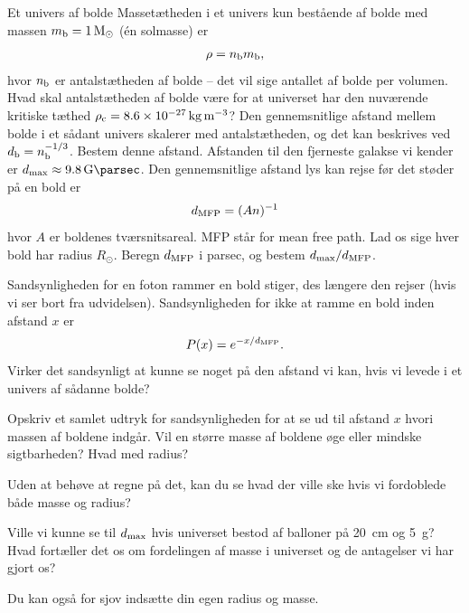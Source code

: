 \documentclass[crop=false, class=memoir]{standalone}
\begin{document}
\begin{opgave}[3]{Et univers af bolde}
Massetætheden i et univers kun bestående af bolde med massen $m_\textup{b} = \SI{1}{M_\odot}$ (én solmasse) er
%
\begin{align} \label{eq:antalsdensitet}
    \rho = n_\textup{b}m_\textup{b},
\end{align}
%
hvor $n_\textup{b}$ er antalstætheden af bolde -- det vil sige antallet af bolde per volumen.
\opg Hvad skal antalstætheden af bolde være for at universet har den nuværende kritiske tæthed $\rho_\textup{c} = \SI{8.6e-27}{\kilogram\per\cubic\metre}$?
\opg Den gennemsnitlige afstand mellem bolde i et sådant univers skalerer med antalstætheden, og det kan beskrives ved $d_\textup{b} = n_\textup{b}^{-1/3}$. Bestem denne afstand.
\opg Afstanden til den fjerneste galakse vi kender er $d_\textup{max} \approx \SI{9.8}{\giga\parsec}$. %
Den gennemsnitlige afstand lys kan rejse før det støder på en bold er
\begin{align}
	d_\textup{MFP} = (A n)^{-1}
\end{align}
hvor $A$ er boldenes tværsnitsareal. MFP står for mean free path. Lad os sige hver bold har radius $R_\odot$. Beregn $d_\textup{MFP}$ i parsec, og bestem $d_\textup{max}/d_\textup{MFP}$.

\opg Sandsynligheden for en foton rammer en bold stiger, des længere den rejser (hvis vi ser bort fra udvidelsen). Sandsynligheden for ikke at ramme en bold inden afstand $x$ er
\begin{align}
	P(x) = e^{-x/d_\textup{MFP}}.
\end{align}
Virker det sandsynligt at kunne se noget på den afstand vi kan, hvis vi levede i et univers af sådanne bolde?

\opg Opskriv et samlet udtryk for sandsynligheden for at se ud til afstand $x$ hvori massen af boldene indgår. Vil en større masse af boldene øge eller mindske sigtbarheden? Hvad med radius? 

Uden at behøve at regne på det, kan du se hvad der ville ske hvis vi fordoblede både masse og radius?

\opg Ville vi kunne se til $d_\textup{max}$ hvis universet bestod af balloner på \SI{20}{\cm} og \SI{5}{\gram}? Hvad fortæller det os om fordelingen af masse i universet og de antagelser vi har gjort os?

Du kan også for sjov indsætte din egen radius og masse.

\end{opgave}
\end{document}
